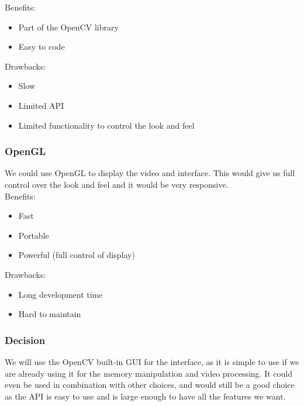 	Benefits:
	\begin{itemize}[leftmargin=2cm,labelindent=2cm]
		\item Part of the OpenCV library
		\item Easy to code
	\end{itemize}
	
	Drawbacks:
	\begin{itemize}[leftmargin=2cm,labelindent=2cm]
		\item Slow
		\item Limited API
		\item Limited functionality to control the look and feel\\
	\end{itemize}
	
	\subsubsection{OpenGL}
	We could use OpenGL to display the video and interface. This would give us full control over the look and feel and it would be very responsive.\\
		
	Benefits:
	\begin{itemize}[leftmargin=2cm,labelindent=2cm]
		\item Fast
		\item Portable
		\item Powerful (full control of display)
	\end{itemize}
	
	Drawbacks:
	\begin{itemize}[leftmargin=2cm,labelindent=2cm]
		\item Long development time
		\item Hard to maintain\\
	\end{itemize}
	
	\subsubsection{\textbf{Decision}}
	We will use the OpenCV built-in GUI for the interface, as it is simple to use if we are already using it for the memory manipulation and video processing. It could even be used in combination with other choices, and would still be a good choice as the API is easy to use and is large enough to have all the features we want.